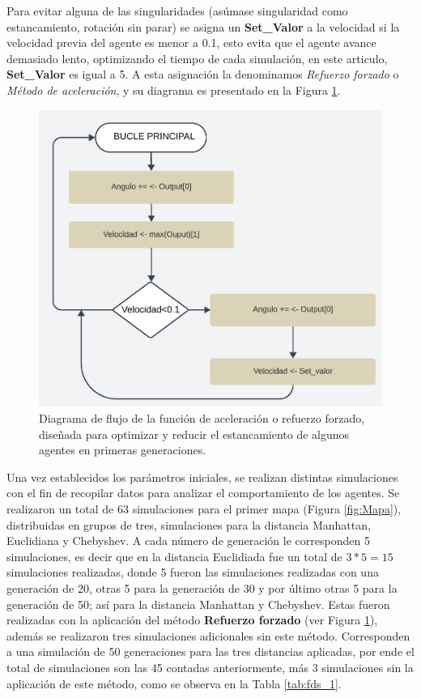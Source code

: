 \documentclass[lettersize, journal]{IEEEtran}
\begin{document}
Para evitar alguna de las singularidades (asúmase singularidad como estancamiento, rotación sin parar) se asigna un \textbf{Set\_Valor} a la velocidad si la velocidad previa del agente es menor a 0.1, esto evita que el agente avance demasiado lento, optimizando el tiempo de cada simulación, en este articulo, \textbf{Set\_Valor} es igual a 5. A esta asignación la denominamos \textit{Refuerzo forzado} o \textit{Método de aceleración}, y su diagrama es presentado en la Figura \ref{fig:reforce}.

\begin{figure}
    \centering
    \includegraphics[width=0.6\linewidth]{images/reforce.png}
    \caption{Diagrama de flujo de la función de aceleración o refuerzo forzado, diseñada para optimizar y reducir el estancamiento de algunos agentes en primeras generaciones.}
    \label{fig:reforce}
\end{figure}

Una vez establecidos los parámetros iniciales, se realizan distintas simulaciones con el fin de recopilar datos para analizar el comportamiento de los agentes. Se realizaron un total de 63 simulaciones para el primer mapa (Figura \ref{fig:Mapa}), distribuidas en grupos de tres, simulaciones para la distancia Manhattan, Euclidiana y Chebyshev. A cada número de generación le corresponden 5 simulaciones, es decir que en la distancia Euclidiada fue un total de $3*5 = 15$ simulaciones realizadas, donde 5 fueron las simulaciones realizadas con una generación de 20, otras 5 para la generación de 30 y por último otras 5 para la generación de 50; así para la distancia Manhattan y Chebyshev. Estas fueron realizadas con la aplicación del método \textbf{Refuerzo forzado} (ver Figura \ref{fig:reforce}), además se realizaron tres simulaciones adicionales sin este método. Corresponden a una simulación de 50 generaciones para las tres distancias aplicadas, por ende el total de simulaciones son las 45 contadas anteriormente, más 3 simulaciones sin la aplicación de este método, como se observa en la Tabla \ref{tab:fds_1}.
\end{document}
